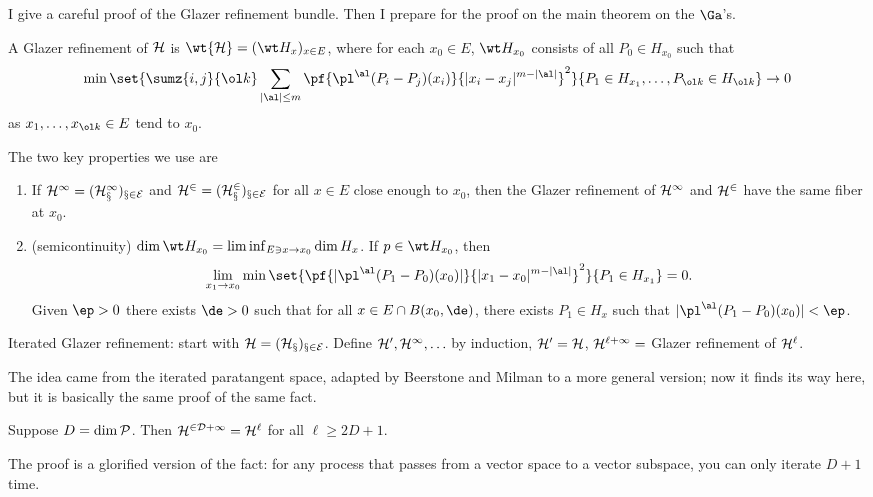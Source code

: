 
I give a careful proof of the Glazer refinement bundle. Then I prepare for the proof on the main theorem on the $\Ga$'s.

A Glazer refinement of $\cal H$ is $\wt{\cal H}=(\wt H_x)_{x\in E}$, where for each $x_0\in E$, $\wt H_{x_0}$ consists of all $P_0\in H_{x_0}$ such that 
\begin{align}
\min
\set{
\sumz{i,j}{\ol k} \sum_{|\al|\le m}
\pf{\pl^\al(P_i-P_j)(x_i)}{|x_i-x_j|^{m-|\al|}}^2
}{
P_1\in H_{x_1},\ldots, P_{\ol k}\in H_{\ol k}
}\to 0 
\end{align}
 as $x_1,\ldots, x_{\ol k}\in E$ tend to $x_0$. 
 
The two key properties we use are
\begin{enumerate}
\item
If $\cal H^1 = (H_x^1)_{x\in E}$ and $\cal H^2 = (H_x^2)_{x\in E}$  for all $x\in E$ close enough to $x_0$, then the Glazer refinement of $\cal H^1$ and $\cal H^2$ have the same fiber at $x_0$.
\item
(semicontinuity)
$\dim \wt H_{x_0} = \liminf_{E\ni x\to x_0} \dim H_x$.
If $p\in \wt H_{x_0}$, then 
\begin{align}
\lim_{x_1\to x_0}\min \set{
\pf{|\pl^\al(P_1-P_0)(x_0)|}{|x_1-x_0|^{m-|\al|}}^2
}{P_1\in H_{x_1}}=0.
\end{align}
Given $\ep>0$ there exists $\de>0$ such that for all $x\in E\cap B(x_0,\de)$, there exists $P_1\in H_x$ such that $|\pl^\al (P_1-P_0)(x_0)|<\ep$.
\end{enumerate}

Iterated Glazer refinement: start with $\cal H=(H_x)_{x\in E}$. Define $\cal H^0,\cal H^1,\ldots$ by induction, $\cal H^0=\cal H$, $\cal H^{\cal \ell+1}=$ Glazer refinement of $\cal H^\ell$. 

The idea came from the iterated paratangent space, adapted by Beerstone and Milman to a more general version; now it finds its way here, but it is basically the same proof of the same fact.
\begin{lem}
Suppose $D=\dim\cal P$. Then $\cal H^{2D+1} = \cal H^\ell$ for all $\ell\ge 2D+1$.
\end{lem}
The proof is a glorified version of the fact: for any process that passes from a vector space to a vector subspace, you can only iterate $D+1$ time.

